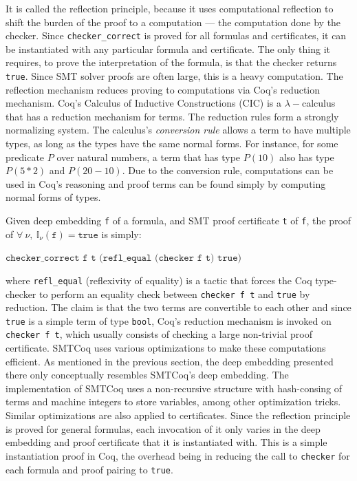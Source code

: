 \documentclass{article}
\begin{document}
\begin{enumerate}
		It is called the reflection 
		principle, because it uses 
		computational reflection 
		to shift the burden of the 
		proof to a computation --- 
		the computation done by 
		the checker. Since 
		\texttt{checker\_correct}
		is proved for all formulas 
		and certificates, it can be 
		instantiated with any 
		particular formula and 
		certificate. The only thing it 
		requires, to 
		prove the interpretation of 
		the formula, is that the 
		checker
		returns \texttt{true}.
		Since SMT solver proofs are 
		often large, this is a 
		heavy computation. The
		reflection mechanism reduces
		proving to computations via 
		Coq's reduction mechanism.
		Coq's Calculus of Inductive 
		Constructions (CIC) is a 
		$\lambda-$calculus that has a 
		reduction mechanism for terms. The
		reduction rules form a strongly 
		normalizing system. The calculus's
		\textit{conversion rule} allows a 
		term to have multiple types, as long as 
		the types have the same normal forms. 
		For instance, for some predicate $P$ 
		over natural numbers, a term that 
		has type $P(10)$ also has type 
		$P(5*2)$ and $P(20-10)$. Due 
		to the conversion rule, 
		computations can be used in Coq's 
		reasoning and proof terms can be 
		found simply by computing normal 
		forms of types.
		
		Given 
		deep embedding \texttt{f}
		of a formula, and 
		SMT proof certificate \texttt{t} of 
		\texttt{f}, the proof of $\forall\ \nu,\ 
		\mathbb{I}_{\nu}(\texttt{f}) = 
		\texttt{true}$ is simply:
		\begin{center}
			$\texttt{checker\_correct f t
				(refl\_equal (checker f t) true)}$
		\end{center}
		where \texttt{refl\_equal} 
		(reflexivity of equality) is a tactic
		that forces the Coq type-checker to 
		perform an equality check between 
		\texttt{checker f t} and 
		\texttt{true} by reduction. 
		The claim is that the two 
		terms are convertible to each other
		and since \texttt{true} is a simple 
		term of type \texttt{bool}, 
		Coq's reduction mechanism is 
		invoked on \texttt{checker f t},
		which usually consists of checking
		a large non-trivial proof certificate. 
		SMTCoq uses various optimizations 
		to make these computations efficient.
		As mentioned in the previous section,
		the deep embedding presented there 
		only conceptually resembles SMTCoq's
		deep embedding. The implementation 
		of SMTCoq uses a non-recursive 
		structure with hash-consing of terms
		and machine integers to store variables,
		among other optimization tricks.
		Similar optimizations are also 
		applied to certificates.
		Since the reflection principle is 
		proved for general formulas, 
		each invocation of it only varies
		in the deep embedding and proof 
		certificate that it is instantiated
		with. This is a simple instantiation
		proof in Coq, the overhead
		being in reducing the call to 
		\texttt{checker} for each 
		formula and proof pairing to 
		\texttt{true}.
\end{enumerate}
	
\end{document}
